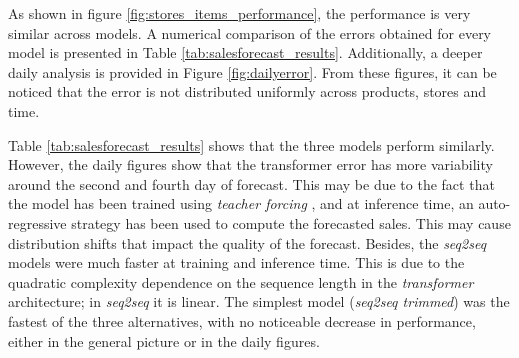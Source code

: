 As shown in figure \ref{fig:stores_items_performance}, the performance is very similar across models. A numerical comparison of the errors obtained for every model is presented in Table \ref{tab:salesforecast_results}. Additionally, a deeper daily analysis is provided in Figure \ref{fig:dailyerror}. From these figures, it can be noticed that the error is not distributed uniformly across products, stores and time.

Table \ref{tab:salesforecast_results} shows that the three models perform similarly. However, the daily figures show that the transformer error has more variability around the second and fourth day of forecast. This may be due to the fact that the model has been trained using \textit{teacher forcing} \autocite{williams1989, Goyal2016}, and at inference time, an auto-regressive strategy has been used to compute the forecasted sales. This may cause distribution shifts that impact the quality of the forecast.  Besides, the \textit{seq2seq} models were much faster at training and inference time. This is due to the quadratic complexity dependence on the sequence length in the \textit{transformer} architecture; in \textit{seq2seq} it is linear. The simplest model (\textit{seq2seq trimmed}) was the fastest of the three alternatives, with no noticeable decrease in performance, either in the general picture or in the daily figures.

